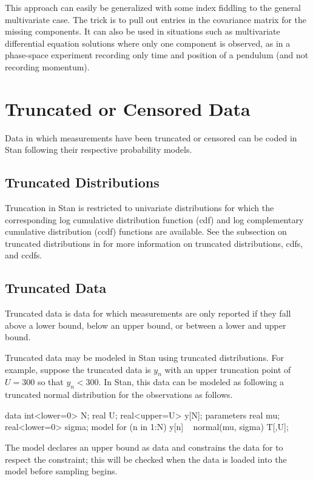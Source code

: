 This approach can easily be generalized with some index fiddling to
the general multivariate case.  The trick is to pull out entries in
the covariance matrix for the missing components.  It can also be used
in situations such as multivariate differential equation solutions
where only one component is observed, as in a phase-space experiment
recording only time and position of a pendulum (and not recording
momentum).


\chapter{Truncated or Censored Data}

\noindent
Data in which measurements have been truncated or censored can be
coded in Stan following their respective probability models.

\section{Truncated Distributions}\label{truncation.section}

Truncation in Stan is restricted to univariate distributions for which
the corresponding log cumulative distribution function (cdf) and log
complementary cumulative distribution (ccdf) functions are available.
See the subsection on truncated distributions in
 for more information on truncated
distributions, cdfs, and ccdfs.

\section{Truncated Data}\label{truncated-data.section}

Truncated data is data for which measurements are only reported if
they fall above a lower bound, below an upper bound, or between a
lower and upper bound.  

Truncated data may be modeled in Stan using truncated distributions.
For example, suppose the truncated data is $y_n$ with an upper
truncation point of $U = 300$ so that $y_n < 300$.  In Stan, this
data can be modeled as following a truncated normal distribution for
the observations as follows. 
%
\begin{stancode}
data {
  int<lower=0> N;
  real U;
  real<upper=U> y[N];
} 
parameters {
  real mu;
  real<lower=0> sigma;
} 
model {
  for (n in 1:N)
    y[n] ~ normal(mu, sigma) T[,U];
}
\end{stancode}
% 
The model declares an upper bound  as data and constrains
the data for  to respect the constraint;  this will be checked
when the data is loaded into the model before sampling begins.

